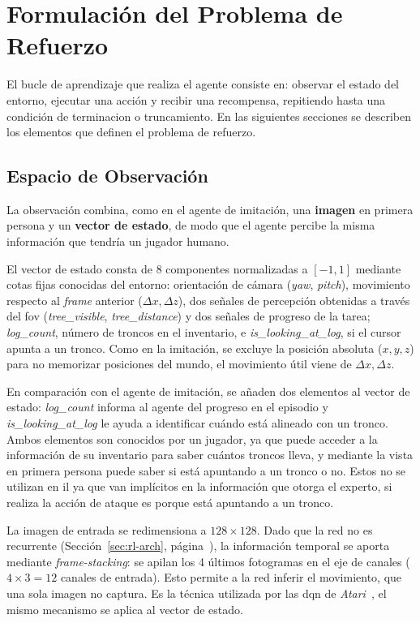 \section{Formulación del Problema de Refuerzo}
El bucle de aprendizaje que realiza el agente consiste en:
observar el estado del entorno, ejecutar una acción y recibir una recompensa, repitiendo
hasta una condición de \gls{terminacion} o \gls{truncamiento}. En las siguientes secciones
se describen los elementos que definen el problema de refuerzo.

\subsection{Espacio de Observación}
\label{sec:rl-obs}
La observación combina, como en el agente de imitación, una
\textbf{imagen} en primera persona y un \textbf{vector de estado}, de modo que
el agente percibe la misma información que tendría un jugador humano.

El vector de estado consta de \num{8} componentes normalizadas a $[-\num{1},\num{1}]$ mediante
cotas fijas conocidas del entorno: orientación de cámara (\textit{yaw}, \textit{pitch}),
movimiento respecto al \textit{frame} anterior ($\Delta x, \Delta z$), dos señales de percepción
obtenidas a través del \gls{fov} (\textit{tree\_visible}, \textit{tree\_distance}) y dos
señales de progreso de la tarea; \textit{log\_count}, número de troncos en el
inventario, e \textit{is\_looking\_at\_log}, si el cursor apunta a un tronco. Como en la
imitación, se excluye la posición absoluta ($x, y, z$) para no memorizar posiciones del
mundo, el movimiento útil viene de $\Delta x, \Delta z$.

En comparación con el agente de imitación, se añaden dos elementos al vector de estado:
\textit{log\_count} informa al agente del progreso en el episodio y
\textit{is\_looking\_at\_log} le ayuda a identificar cuándo está alineado con un tronco.
Ambos elementos son conocidos por un jugador, ya que puede acceder a la información de su inventario
para saber cuántos troncos lleva, y mediante la vista en primera persona puede saber si está
apuntando a un tronco o no. Estos no se utilizan en \gls{il} ya que van implícitos en la información que
otorga el experto, si realiza la acción de ataque es porque está apuntando a un tronco.

La imagen de entrada se redimensiona a $\num{128}\times\num{128}$. Dado que la red no es
recurrente (Sección~\ref{sec:rl-arch}, página~\pageref{sec:rl-arch}), la información temporal se aporta mediante
\textit{\gls{frame-stacking}}: se apilan los \num{4} últimos fotogramas en el eje de canales
($\num{4}\times\num{3} = \num{12}$ canales de entrada). Esto permite a la red inferir el movimiento,
que una sola imagen no captura. Es la técnica utilizada por las \gls{dqn}
de \textit{Atari}~\cite{DBLP:journals/nature/MnihKSRVBGRFOPB15}, el mismo mecanismo se aplica al
vector de estado.


